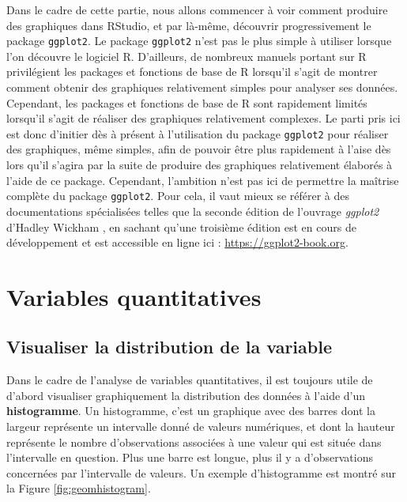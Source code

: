 \documentclass[
  french,
]{book}
\begin{document}
Dans le cadre de cette partie, nous allons commencer à voir comment produire des graphiques dans RStudio, et par là-même, découvrir progressivement le package \texttt{ggplot2}. Le package \texttt{ggplot2} n'est pas le plus simple à utiliser lorsque l'on découvre le logiciel R. D'ailleurs, de nombreux manuels portant sur R privilégient les packages et fonctions de base de R lorsqu'il s'agit de montrer comment obtenir des graphiques relativement simples pour analyser ses données. Cependant, les packages et fonctions de base de R sont rapidement limités lorsqu'il s'agit de réaliser des graphiques relativement complexes. Le parti pris ici est donc d'initier dès à présent à l'utilisation du package \texttt{ggplot2} pour réaliser des graphiques, même simples, afin de pouvoir être plus rapidement à l'aise dès lors qu'il s'agira par la suite de produire des graphiques relativement élaborés à l'aide de ce package. Cependant, l'ambition n'est pas ici de permettre la maîtrise complète du package \texttt{ggplot2}. Pour cela, il vaut mieux se référer à des documentations spécialisées telles que la seconde édition de l'ouvrage \emph{ggplot2} d'Hadley Wickham \autocite*{wickhamGgplot22016}, en sachant qu'une troisième édition est en cours de développement et est accessible en ligne ici : \url{https://ggplot2-book.org}.

\hypertarget{variables-quantitatives}{%
\section{Variables quantitatives}\label{variables-quantitatives}}

\hypertarget{visualiser-la-distribution-de-la-variable}{%
\subsection{Visualiser la distribution de la variable}\label{visualiser-la-distribution-de-la-variable}}

Dans le cadre de l'analyse de variables quantitatives, il est toujours utile de d'abord visualiser graphiquement la distribution des données à l'aide d'un \textbf{histogramme}. Un histogramme, c'est un graphique avec des barres dont la largeur représente un intervalle donné de valeurs numériques, et dont la hauteur représente le nombre d'observations associées à une valeur qui est située dans l'intervalle en question. Plus une barre est longue, plus il y a d'observations concernées par l'intervalle de valeurs. Un exemple d'histogramme est montré sur la Figure \ref{fig:geomhistogram}.
\end{document}
